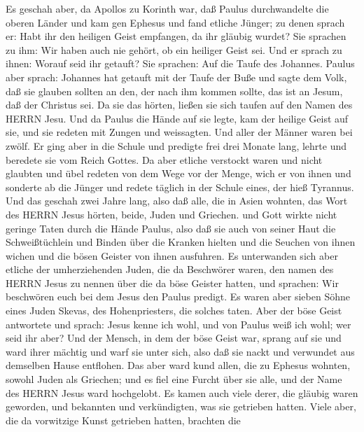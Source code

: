  Es geschah aber, da Apollos zu Korinth war, daß Paulus
durchwandelte die oberen Länder und kam gen Ephesus und fand etliche
Jünger;  zu denen sprach er: Habt ihr den heiligen Geist
empfangen, da ihr gläubig wurdet? Sie sprachen zu ihm: Wir haben auch
nie gehört, ob ein heiliger Geist sei.  Und er sprach zu
ihnen: Worauf seid ihr getauft? Sie sprachen: Auf die Taufe des
Johannes.  Paulus aber sprach: Johannes hat getauft mit der
Taufe der Buße und sagte dem Volk, daß sie glauben sollten an den, der
nach ihm kommen sollte, das ist an Jesum, daß der Christus sei.
 Da sie das hörten, ließen sie sich taufen auf den Namen des
HERRN Jesu.  Und da Paulus die Hände auf sie legte, kam der
heilige Geist auf sie, und sie redeten mit Zungen und weissagten.
 Und aller der Männer waren bei zwölf.  Er ging
aber in die Schule und predigte frei drei Monate lang, lehrte und
beredete sie vom Reich Gottes.  Da aber etliche verstockt
waren und nicht glaubten und übel redeten von dem Wege vor der Menge,
wich er von ihnen und sonderte ab die Jünger und redete täglich in der
Schule eines, der hieß Tyrannus.  Und das geschah zwei
Jahre lang, also daß alle, die in Asien wohnten, das Wort des HERRN
Jesus hörten, beide, Juden und Griechen.  und Gott wirkte
nicht geringe Taten durch die Hände Paulus,  also daß sie
auch von seiner Haut die Schweißtüchlein und Binden über die Kranken
hielten und die Seuchen von ihnen wichen und die bösen Geister von ihnen
ausfuhren.  Es unterwanden sich aber etliche der
umherziehenden Juden, die da Beschwörer waren, den namen des HERRN Jesus
zu nennen über die da böse Geister hatten, und sprachen: Wir beschwören
euch bei dem Jesus den Paulus predigt.  Es waren aber
sieben Söhne eines Juden Skevas, des Hohenpriesters, die solches taten.
 Aber der böse Geist antwortete und sprach: Jesus kenne ich
wohl, und von Paulus weiß ich wohl; wer seid ihr aber?  Und
der Mensch, in dem der böse Geist war, sprang auf sie und ward ihrer
mächtig und warf sie unter sich, also daß sie nackt und verwundet aus
demselben Hause entflohen.  Das aber ward kund allen, die
zu Ephesus wohnten, sowohl Juden als Griechen; und es fiel eine Furcht
über sie alle, und der Name des HERRN Jesus ward hochgelobt.
 Es kamen auch viele derer, die gläubig waren geworden, und
bekannten und verkündigten, was sie getrieben hatten. 
Viele aber, die da vorwitzige Kunst getrieben hatten, brachten die
